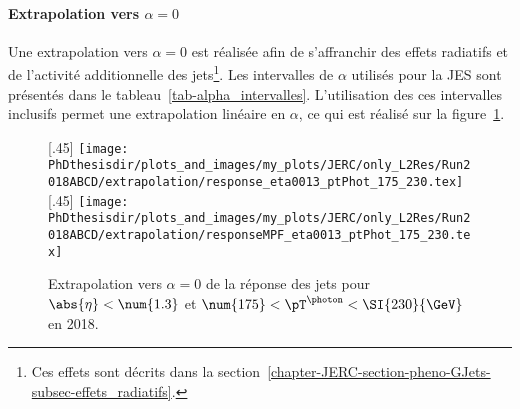 \paragraph{Extrapolation vers $\alpha=0$}
Une extrapolation vers $\alpha=0$ est réalisée afin de s'affranchir des effets radiatifs et de l'activité additionnelle des jets\footnote{Ces effets sont décrits dans la section~\ref{chapter-JERC-section-pheno-GJets-subsec-effets_radiatifs}.}.
Les intervalles de $\alpha$ utilisés pour la JES sont présentés dans le tableau~\ref{tab-alpha_intervalles}.
L'utilisation des ces intervalles inclusifs permet une extrapolation linéaire en $\alpha$, ce qui est réalisé sur la figure~\ref{fig-chapter-JERC-section-JES-subsec-analyse-responsebal_and_MPF_eta0013_ptPhot_175_230_extrap}.
\begin{figure}[h]
\centering
{}[.45\textwidth]
{\texttt{[image: \\PhDthesisdir/plots\_and\_images/my\_plots/JERC/only\_L2Res/Run2018ABCD/extrapolation/response\_eta0013\_ptPhot\_175\_230.tex]}}
\hfill
{}[.45\textwidth]
{\texttt{[image: \\PhDthesisdir/plots\_and\_images/my\_plots/JERC/only\_L2Res/Run2018ABCD/extrapolation/responseMPF\_eta0013\_ptPhot\_175\_230.tex]}}
\caption[Extrapolation vers $\alpha=0$ de la réponse des jets.]{Extrapolation vers $\alpha=0$ de la réponse des jets pour $\abs{\eta}<\num{1.3}$ et $\num{175}<\pT^{\photon}<\SI{230}{\GeV}$ en 2018.}
\label{fig-chapter-JERC-section-JES-subsec-analyse-responsebal_and_MPF_eta0013_ptPhot_175_230_extrap}
\end{figure}
